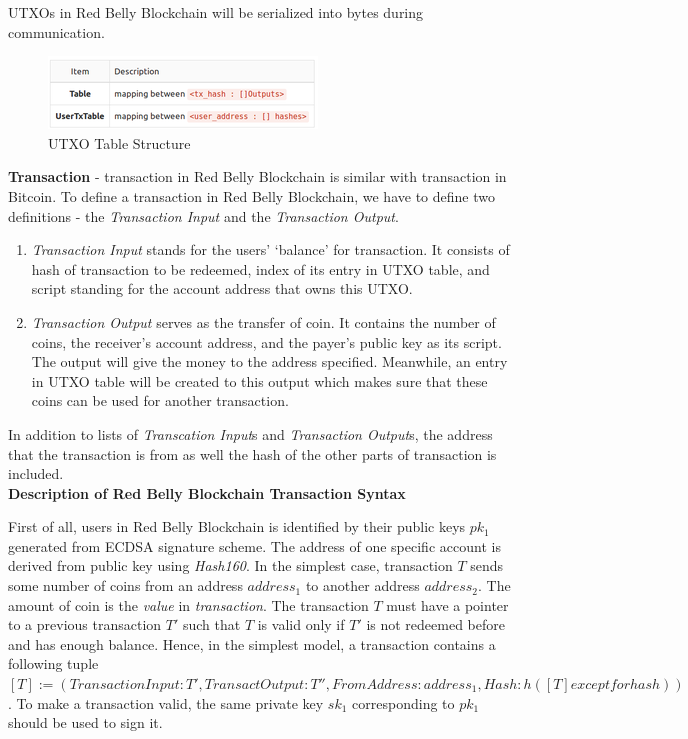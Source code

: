 \documentclass[12pt]{article}
\begin{document}
UTXOs in Red Belly Blockchain will be serialized into bytes during communication.
\\

\begin{figure}
    \centering
    \includegraphics{utxo_table.png}
    \caption{UTXO Table Structure}
    \label{fig:utxo_table}
\end{figure}

\textbf{Transaction} - transaction in Red Belly Blockchain is similar with transaction in Bitcoin. To define a transaction in Red Belly Blockchain, we have to define two definitions - the \textit{Transaction Input} and the \textit{Transaction Output}.

\begin{enumerate}
       \item \textit{Transaction Input} stands for the users' `balance' for transaction. It consists of hash of transaction to be redeemed, index of its entry in UTXO table, and script standing for the account address that owns this UTXO.
       \item \textit{Transaction Output} serves as the transfer of coin. It contains the number of coins, the receiver's account address, and the payer's public key as its script. The output will give the money to the address specified. Meanwhile, an entry in UTXO table will be created to this output which makes sure that these coins can be used for another transaction.
\end{enumerate}

In addition to lists of \textit{Transcation Input}s and \textit{Transaction Output}s, the address that the transaction is from as well the hash of the other parts of transaction is included.\\

\textbf{Description of Red Belly Blockchain Transaction Syntax}

First of all, users in Red Belly Blockchain is identified by their public keys ${pk_1}$ generated from ECDSA signature scheme. The address of one specific account is derived from public key using \textit{Hash160}. In the simplest case, transaction $T$ sends some number of coins from an address ${address_1}$ to another address ${address_2}$. The amount of coin is the \textit{value} in \textit{transaction}. The transaction $T$ must have a pointer to a previous transaction $T'$ such that $T$ is valid only if $T'$ is not redeemed before and has enough balance. Hence, in the simplest model, a transaction contains a following tuple $[T] := (TransactionInput: T', TransactOutput: T'', FromAddress: {address_1}, Hash: h([T] except for hash))$. To make a transaction valid, the same private key ${sk_1}$ corresponding to ${pk_1}$ should be used to sign it.
\end{document}
